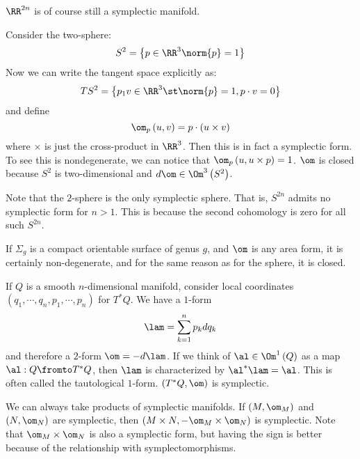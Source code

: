 \documentclass{amsart}
\begin{document}
\begin{exm}
$\RR^{2n}$ is of course still a symplectic manifold.
\end{exm}

\begin{exm}
Consider the two-sphere:
\begin{equation}
S^2 = \left\{ p\in \RR^3
\norm{p} = 1\right\}
\end{equation}
Now we can write the tangent space explicitly as:
\begin{equation}
TS^2 = \left\{ p_1 v\in \RR^3 \st \norm{p} = 1, p\cdot v = 0 \right\}
\end{equation}
and define
\begin{equation}
\om_p\left( u, v \right) = p\cdot \left( u\times v \right)
\end{equation}
where $\times $ is just the cross-product in $\RR^3$. 
Then this is in fact a symplectic form.
To see this is nondegenerate, we can notice that
$\om_p\left( u , u\times p \right)= 1$. 
$\om$ is closed because $S^2$ is two-dimensional and $d\om\in \Om^3\left( S^2 \right)$.

Note that the $2$-sphere is the only symplectic sphere. 
That is, $S^{2n}$ admits no symplectic form for $n  > 1$.
This is because the second cohomology is zero for all such $S^{2n}$.
\end{exm}

\begin{exm}
If $\Sigma_g$ is a compact orientable surface of genus $g$, and $\om$ is any area form, it is certainly
non-degenerate, and for the same reason as for the sphere, it is closed.
\end{exm}

\begin{exm}
If $Q$ is a smooth $n$-dimensional manifold, 
consider local coordinates $\left( q_1 , \cdots , q_n , p_1 , \cdots , p_n \right)$
for $T^*Q$. We have a $1$-form
\begin{equation}
\lam = 
\sum_{k = 1}^n p_k d q_k
\end{equation}
and therefore a $2$-form $\om = -d \lam$. 
If we think of $\al \in \Om^1\left( Q \right)$ as a map $\al: Q\fromto T^* Q$,
then $\lam$ is characterized by $\al^* \lam = \al$. 
This is often called the tautological $1$-form.
$\left( T^* Q , \om \right)$ is symplectic.
\end{exm}

\begin{exm}
We can always take products of symplectic manifolds. 
If $\left( M , \om_M \right)$ and $\left( N , \om_N \right)$ are symplectic, 
then $\left( M \times N , -\om_M\times \om_N  \right)$ is symplectic.
Note that $\om_M\times \om_N$ is also a symplectic form, but having the sign is better
because of the relationship with symplectomorphisms.
\end{exm}
\end{document}
